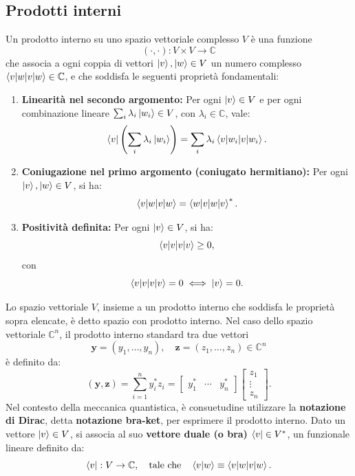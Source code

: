 \documentclass[a4paper,12pt]{report}
\theoremstyle{plain}
\begin{document}
\subsection{Prodotti interni}
Un prodotto interno su uno spazio vettoriale complesso \( V \) è una funzione  
\[(\cdot, \cdot) : V \times V \rightarrow \mathbb{C}\]  
che associa a ogni coppia di vettori \( \ket{v}, \ket{w} \in V \) un numero complesso \(\braket{v|w} \in \mathbb{C}\), e che soddisfa le seguenti proprietà fondamentali:  
\begin{enumerate}
    \item \textbf{Linearità nel secondo argomento:}  
        Per ogni \( \ket{v} \in V \) e per ogni combinazione lineare \(\sum_i \lambda_i \ket{w_i} \in V\), con \(\lambda_i \in \mathbb{C}\), vale:  
        \[
        \bra{v} \left( \sum_i \lambda_i \ket{w_i} \right) = \sum_i \lambda_i \braket{v|w_i}.
        \]    
    \item \textbf{Coniugazione nel primo argomento (coniugato hermitiano):}  
        Per ogni \( \ket{v}, \ket{w} \in V \), si ha:  
        \[
        \braket{v|w} = \braket{w|v}^*.
        \]
    \item \textbf{Positività definita:}  
        Per ogni \( \ket{v} \in V \), si ha:  
        \[
        \braket{v|v} \geq 0,
        \]  
        con  
        \[
        \braket{v|v} = 0 \iff \ket{v} = 0.
        \]
\end{enumerate}
Lo spazio vettoriale \( V \), insieme a un prodotto interno che soddisfa le proprietà sopra elencate, è detto spazio con prodotto interno.
Nel caso dello spazio vettoriale \( \mathbb{C}^n \), il prodotto interno standard tra due vettori
\[
\mathbf{y} = (y_1, \ldots, y_n), \quad \mathbf{z} = (z_1, \ldots, z_n) \in \mathbb{C}^n
\]
è definito da:
\[
(\mathbf{y}, \mathbf{z}) = \sum_{i=1}^n y_i^* z_i = 
\begin{bmatrix} y_1^* & \cdots & y_n^* \end{bmatrix} 
\begin{bmatrix} z_1 \\ \vdots \\ z_n \end{bmatrix}.
\]
Nel contesto della meccanica quantistica, è consuetudine utilizzare la \textbf{notazione di Dirac}, detta \textbf{notazione bra-ket}, per esprimere il prodotto interno. Dato un vettore \( \ket{v} \in V \), si associa al suo \textbf{vettore duale (o bra)}  
\( \bra{v} \in V^* \), un funzionale lineare definito da:
\[
\bra{v} : V \rightarrow \mathbb{C}, \quad \text{tale che} \quad \bra{v}\ket{w} \equiv \braket{v|w}.
\]
\end{document}
